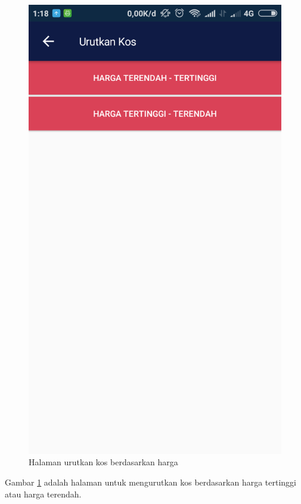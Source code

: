		\begin{figure}[H]
			\centering
			\includegraphics[scale=0.25]{gambar/and/6}
			\caption{Halaman urutkan kos berdasarkan harga}
			\label{and6}
		\end{figure}
	
		Gambar \ref{and6} adalah halaman untuk mengurutkan kos berdasarkan harga tertinggi atau harga terendah.
		
